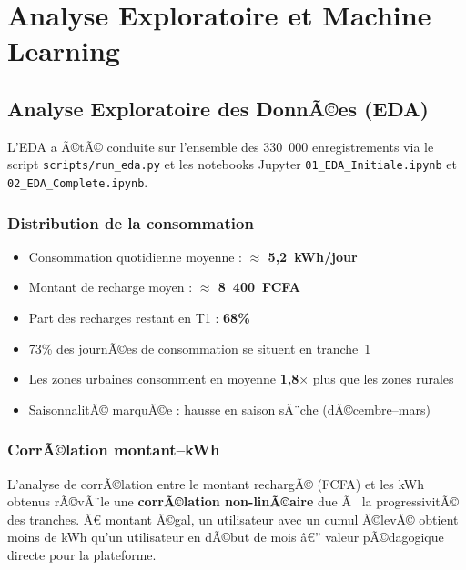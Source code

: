 \documentclass[12pt,a4paper]{report}
\begin{document}
\chapter{Analyse Exploratoire et Machine Learning}
\label{ch:eda_ml}

\section{Analyse Exploratoire des DonnÃ©es (EDA)}

L'EDA a Ã©tÃ© conduite sur l'ensemble des 330~000 enregistrements via le script \texttt{scripts/run\_eda.py} et les notebooks Jupyter \texttt{01\_EDA\_Initiale.ipynb} et \texttt{02\_EDA\_Complete.ipynb}.

\subsection{Distribution de la consommation}

\begin{infobox}
\begin{itemize}
  \item Consommation quotidienne moyenne : \textbf{$\approx$ 5,2~kWh/jour}
  \item Montant de recharge moyen : \textbf{$\approx$ 8~400~FCFA}
  \item Part des recharges restant en T1 : \textbf{68\%}
  \item 73\% des journÃ©es de consommation se situent en tranche~1
  \item Les zones urbaines consomment en moyenne \textbf{1,8$\times$} plus que les zones rurales
  \item SaisonnalitÃ© marquÃ©e : hausse en saison sÃ¨che (dÃ©cembre--mars)
\end{itemize}
\end{infobox}

\subsection{CorrÃ©lation montant--kWh}

L'analyse de corrÃ©lation entre le montant rechargÃ© (FCFA) et les kWh obtenus rÃ©vÃ¨le une \textbf{corrÃ©lation non-linÃ©aire} due Ã  la progressivitÃ© des tranches. Ã€ montant Ã©gal, un utilisateur avec un cumul Ã©levÃ© obtient moins de kWh qu'un utilisateur en dÃ©but de mois â€” valeur pÃ©dagogique directe pour la plateforme.
\end{document}
